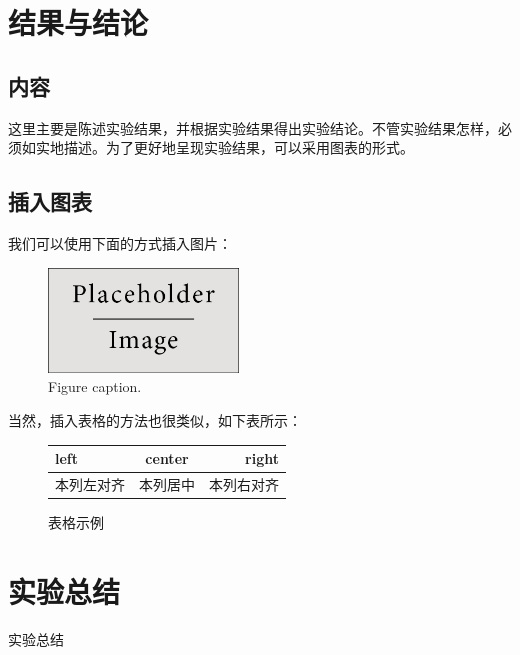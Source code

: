\documentclass[hyperref,UTF8]{ctexart}
\begin{document}
\section{结果与结论}

\subsection{内容}

这里主要是陈述实验结果，并根据实验结果得出实验结论。不管实验结果怎样，必须如实地描述。为了更好地呈现实验结果，可以采用图表的形式。

\subsection{插入图表}

我们可以使用下面的方式插入图片：

\begin{figure}[H]
\centering
\includegraphics[width=0.45\textwidth,height=0.25\textwidth]{placeholder} %
\caption{Figure caption.}
\label{fig:image}
\end{figure}

当然，插入表格的方法也很类似，如下表所示：

\begin{figure}[H]
\centering
\begin{tabular}{|l|c|r|}
\hline
left & center & right	\\
\hline
本列左对齐 & 本列居中 & 本列右对齐	\\
\hline
\end{tabular}
\caption{表格示例}
\end{figure}


\section{实验总结}

实验总结






\end{document}
